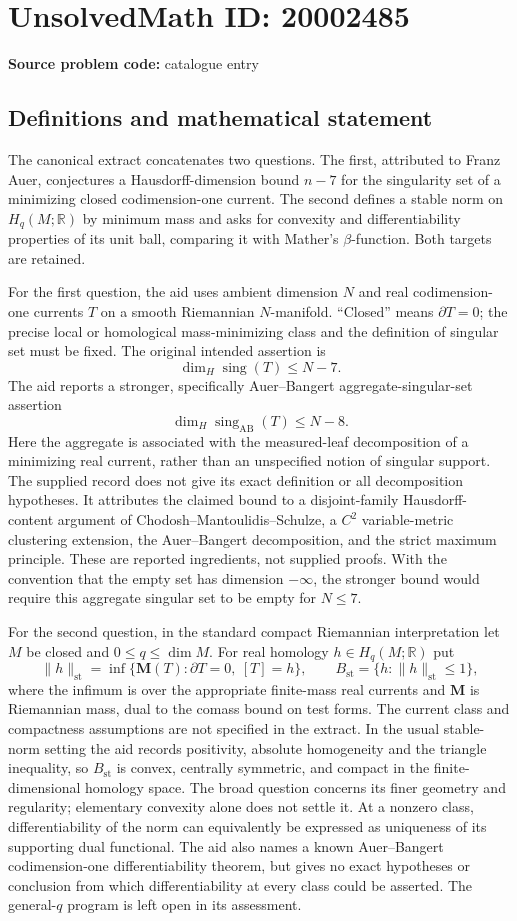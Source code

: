 \documentclass[11pt]{article}
\newcommand{\R}{\mathbb{R}}
\begin{document}
\section*{UnsolvedMath ID: 20002485}
\textbf{Source problem code:} catalogue entry
\subsection{Definitions and mathematical statement}
The canonical extract concatenates two questions. The first, attributed to Franz Auer, conjectures a Hausdorff-dimension bound $n-7$ for the singularity set of a minimizing closed codimension-one current. The second defines a stable norm on $H_q(M;\R)$ by minimum mass and asks for convexity and differentiability properties of its unit ball, comparing it with Mather's $\beta$-function. Both targets are retained.

For the first question, the aid uses ambient dimension $N$ and real codimension-one currents $T$ on a smooth Riemannian $N$-manifold. ``Closed'' means $\partial T=0$; the precise local or homological mass-minimizing class and the definition of singular set must be fixed. The original intended assertion is
\[
 \dim_H\operatorname{sing}(T)\le N-7.
\]
The aid reports a stronger, specifically Auer--Bangert aggregate-singular-set assertion
\[
 \dim_H\operatorname{sing}_{\mathrm{AB}}(T)\le N-8.
\]
Here the aggregate is associated with the measured-leaf decomposition of a minimizing real current, rather than an unspecified notion of singular support. The supplied record does not give its exact definition or all decomposition hypotheses. It attributes the claimed bound to a disjoint-family Hausdorff-content argument of Chodosh--Mantoulidis--Schulze, a $C^2$ variable-metric clustering extension, the Auer--Bangert decomposition, and the strict maximum principle. These are reported ingredients, not supplied proofs. With the convention that the empty set has dimension $-\infty$, the stronger bound would require this aggregate singular set to be empty for $N\le7$.

For the second question, in the standard compact Riemannian interpretation let $M$ be closed and $0\le q\le\dim M$. For real homology $h\in H_q(M;\R)$ put
\[
 \|h\|_{\mathrm{st}}=
 \inf\{\mathbf M(T):\partial T=0,\ [T]=h\},\qquad
 B_{\mathrm{st}}=\{h:\|h\|_{\mathrm{st}}\le1\},
\]
where the infimum is over the appropriate finite-mass real currents and $\mathbf M$ is Riemannian mass, dual to the comass bound on test forms. The current class and compactness assumptions are not specified in the extract. In the usual stable-norm setting the aid records positivity, absolute homogeneity and the triangle inequality, so $B_{\mathrm{st}}$ is convex, centrally symmetric, and compact in the finite-dimensional homology space. The broad question concerns its finer geometry and regularity; elementary convexity alone does not settle it. At a nonzero class, differentiability of the norm can equivalently be expressed as uniqueness of its supporting dual functional. The aid also names a known Auer--Bangert codimension-one differentiability theorem, but gives no exact hypotheses or conclusion from which differentiability at every class could be asserted. The general-$q$ program is left open in its assessment.
\end{document}
